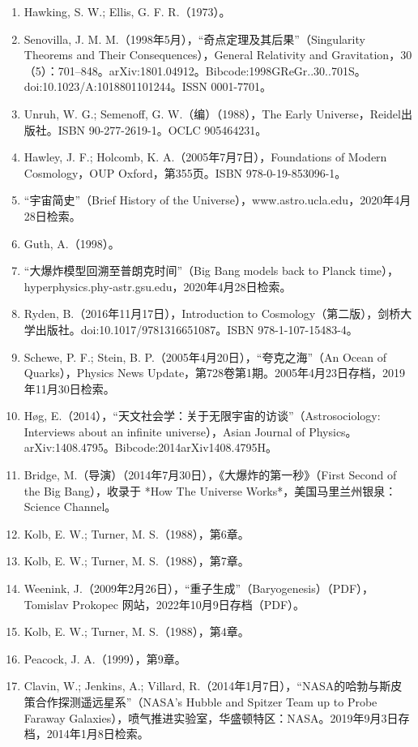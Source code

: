 \begin{enumerate}
\item Hawking, S. W.; Ellis, G. F. R.（1973）。  
\item Senovilla, J. M. M.（1998年5月），“奇点定理及其后果”（Singularity Theorems and Their Consequences），General Relativity and Gravitation，30（5）：701–848。arXiv:1801.04912。Bibcode:1998GReGr..30..701S。doi:10.1023/A:1018801101244。ISSN 0001-7701。  
\item Unruh, W. G.; Semenoff, G. W.（编）（1988），The Early Universe，Reidel出版社。ISBN 90-277-2619-1。OCLC 905464231。  
\item Hawley, J. F.; Holcomb, K. A.（2005年7月7日），Foundations of Modern Cosmology，OUP Oxford，第355页。ISBN 978-0-19-853096-1。  
\item “宇宙简史”（Brief History of the Universe），www.astro.ucla.edu，2020年4月28日检索。  
\item Guth, A.（1998）。  
\item “大爆炸模型回溯至普朗克时间”（Big Bang models back to Planck time），hyperphysics.phy-astr.gsu.edu，2020年4月28日检索。  
\item Ryden, B.（2016年11月17日），Introduction to Cosmology（第二版），剑桥大学出版社。doi:10.1017/9781316651087。ISBN 978-1-107-15483-4。  
\item Schewe, P. F.; Stein, B. P.（2005年4月20日），“夸克之海”（An Ocean of Quarks），Physics News Update，第728卷第1期。2005年4月23日存档，2019年11月30日检索。  
\item Høg, E.（2014），“天文社会学：关于无限宇宙的访谈”（Astrosociology: Interviews about an infinite universe），Asian Journal of Physics。arXiv:1408.4795。Bibcode:2014arXiv1408.4795H。  
\item Bridge, M.（导演）（2014年7月30日），《大爆炸的第一秒》（First Second of the Big Bang），收录于 *How The Universe Works*，美国马里兰州银泉：Science Channel。  
\item Kolb, E. W.; Turner, M. S.（1988），第6章。  
\item Kolb, E. W.; Turner, M. S.（1988），第7章。  
\item Weenink, J.（2009年2月26日），“重子生成”（Baryogenesis）（PDF），Tomislav Prokopec 网站，2022年10月9日存档（PDF）。  
\item Kolb, E. W.; Turner, M. S.（1988），第4章。  
\item Peacock, J. A.（1999），第9章。  
\item Clavin, W.; Jenkins, A.; Villard, R.（2014年1月7日），“NASA的哈勃与斯皮策合作探测遥远星系”（NASA's Hubble and Spitzer Team up to Probe Faraway Galaxies），喷气推进实验室，华盛顿特区：NASA。2019年9月3日存档，2014年1月8日检索。  

\end{enumerate}
